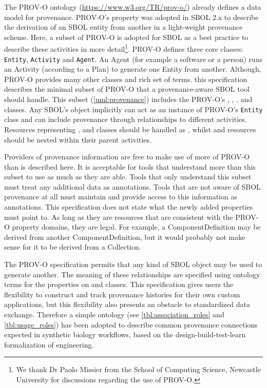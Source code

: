 The PROV-O ontology (\url{https://www.w3.org/TR/prov-o/}) already defines a data model for provenance. PROV-O's  property was adopted in SBOL 2.x to describe the derivation of an SBOL entity from another in a light-weight provenance scheme.  Here, a subset of PROV-O is adopted for SBOL as a best practice to describe these activities in more detail\footnote{We thank Dr Paolo Missier from the School of Computing Science, Newcastle University for discussions regarding the use of PROV-O.}. PROV-O defines three core classes: \texttt{Entity}, \texttt{Activity} and \texttt{Agent}. An Agent (for example a software or a person) runs an Activity (according to a Plan) to generate one Entity from another. Although, PROV-O provides many other classes and rich set of terms. this specification describes the minimal subset of PROV-O that a provenance-aware SBOL tool should handle. This subset (\ref{uml:provenance}) includes the PROV-O's , , ,  and  classes. Any SBOL's  object implicitly can act as an instance of PROV-O's \texttt{Entity} class and can include provenance through relationships to different activities. Resources representing ,  and  classes should be handled as , whilst  and  resources should be nested within their parent activities. 


Providers of provenance information are free to make use of more of PROV-O than is described here. It is acceptable for tools that understand more than this subset to use as much as they are able. Tools that only understand this subset must treat any additional data as annotations. Tools that are not aware of SBOL provenance at all must maintain and provide access to this information as annotations. This specification does not state what the newly added properties must point to. As long as they are resources that are consistent with the PROV-O property domains, they are legal. For example, a ComponentDefinition may be derived from another ComponentDefinition, but it would probably not make sense for it to be derived from a Collection.


The PROV-O specification permits that any kind of SBOL object may be used to generate another. The meaning of these relationships are specified using ontology terms for the  properties on  and  classes.  This specification gives users the flexibility to construct and track provenance histories for their own custom applications, but this flexibility also presents an obstacle to standardized data exchange. Therefore a simple ontology (see \ref{tbl:association_roles} and \ref{tbl:usage_roles}) has been adopted to describe common provenance connections expected in synthetic biology workflows, based on the design-build-test-learn formalization of engineering.

